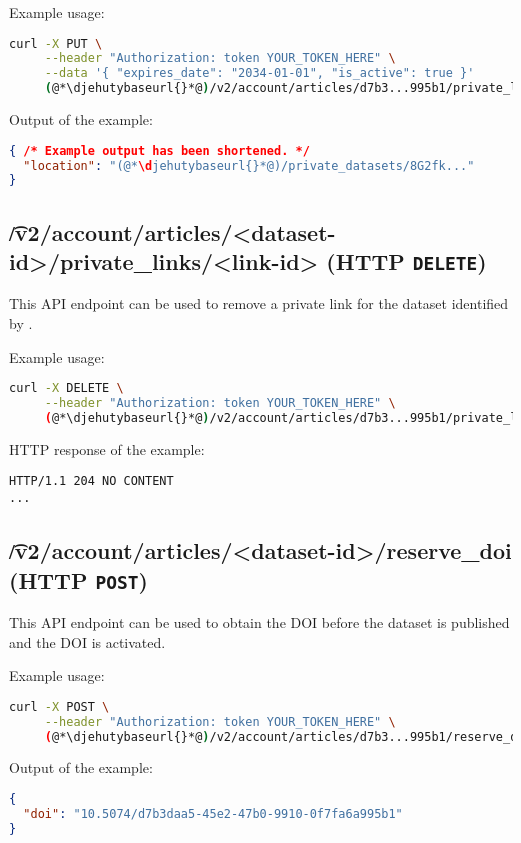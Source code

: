   Example usage:
\begin{lstlisting}[language=bash]
curl -X PUT \
     --header "Authorization: token YOUR_TOKEN_HERE" \
     --data '{ "expires_date": "2034-01-01", "is_active": true }'
     (@*\djehutybaseurl{}*@)/v2/account/articles/d7b3...995b1/private_links/8G2fk... | jq
\end{lstlisting}

  Output of the example:
\begin{lstlisting}[language=JSON]
{ /* Example output has been shortened. */
  "location": "(@*\djehutybaseurl{}*@)/private_datasets/8G2fk..."
}
\end{lstlisting}

\subsection{\t{/v2/account/articles/<dataset-id>/private\_links/<link-id>} (HTTP \texttt{DELETE})}

  This API endpoint can be used to remove a private link for the dataset identified
  by .

  Example usage:
\begin{lstlisting}[language=bash]
curl -X DELETE \
     --header "Authorization: token YOUR_TOKEN_HERE" \
     (@*\djehutybaseurl{}*@)/v2/account/articles/d7b3...995b1/private_links/8G2fk...
\end{lstlisting}

  HTTP response of the example:
\begin{lstlisting}
HTTP/1.1 204 NO CONTENT
...
\end{lstlisting}

\subsection{\t{/v2/account/articles/<dataset-id>/reserve\_doi} (HTTP \texttt{POST})}

  This API endpoint can be used to obtain the DOI before the dataset is
  published and the DOI is activated.

  Example usage:
\begin{lstlisting}[language=bash]
curl -X POST \
     --header "Authorization: token YOUR_TOKEN_HERE" \
     (@*\djehutybaseurl{}*@)/v2/account/articles/d7b3...995b1/reserve_doi | jq
\end{lstlisting}

  Output of the example:
\begin{lstlisting}[language=JSON]
{
  "doi": "10.5074/d7b3daa5-45e2-47b0-9910-0f7fa6a995b1"
}
\end{lstlisting}

